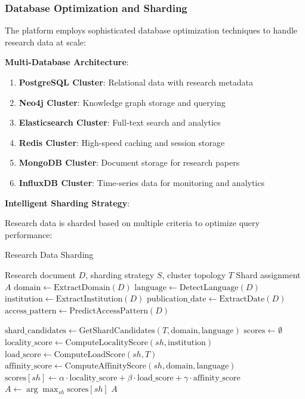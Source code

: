 \documentclass[10pt,twocolumn]{article}
\begin{document}
\subsubsection{Database Optimization and Sharding}

The platform employs sophisticated database optimization techniques to handle research data at scale:

\textbf{Multi-Database Architecture}:
\begin{enumerate}
    \item \textbf{PostgreSQL Cluster}: Relational data with research metadata
    \item \textbf{Neo4j Cluster}: Knowledge graph storage and querying
    \item \textbf{Elasticsearch Cluster}: Full-text search and analytics
    \item \textbf{Redis Cluster}: High-speed caching and session storage
    \item \textbf{MongoDB Cluster}: Document storage for research papers
    \item \textbf{InfluxDB Cluster}: Time-series data for monitoring and analytics
\end{enumerate}

\textbf{Intelligent Sharding Strategy}:

Research data is sharded based on multiple criteria to optimize query performance:

\begin{algorithm}[H]
\caption{Research Data Sharding}
\label{alg:data_sharding}
\begin{algorithmic}[1]
\REQUIRE Research document $D$, sharding strategy $S$, cluster topology $T$
\ENSURE Shard assignment $A$
\STATE $\text{domain} \leftarrow \text{ExtractDomain}(D)$
\STATE $\text{language} \leftarrow \text{DetectLanguage}(D)$
\STATE $\text{institution} \leftarrow \text{ExtractInstitution}(D)$
\STATE $\text{publication\_date} \leftarrow \text{ExtractDate}(D)$
\STATE $\text{access\_pattern} \leftarrow \text{PredictAccessPattern}(D)$

\STATE $\text{shard\_candidates} \leftarrow \text{GetShardCandidates}(T, \text{domain}, \text{language})$
\STATE $\text{scores} \leftarrow \emptyset$
    \STATE $\text{locality\_score} \leftarrow \text{ComputeLocalityScore}(sh, \text{institution})$
    \STATE $\text{load\_score} \leftarrow \text{ComputeLoadScore}(sh, T)$
    \STATE $\text{affinity\_score} \leftarrow \text{ComputeAffinityScore}(sh, \text{domain}, \text{language})$
    \STATE $\text{scores}[sh] \leftarrow \alpha \cdot \text{locality\_score} + \beta \cdot \text{load\_score} + \gamma \cdot \text{affinity\_score}$
\ENDFOR
\STATE $A \leftarrow \arg\max_{sh} \text{scores}[sh]$
\RETURN $A$
\end{algorithmic}
\end{algorithm}
\end{document}
